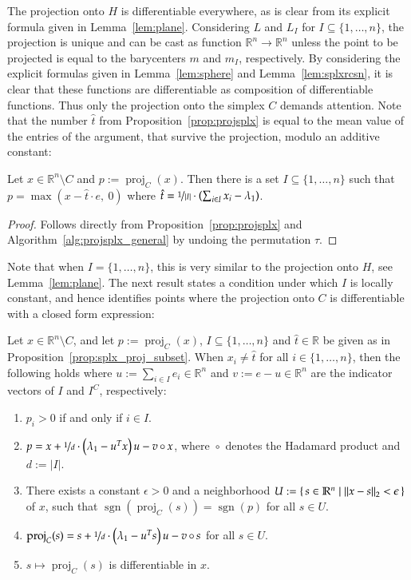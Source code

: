 \documentclass[twoside,11pt]{article}
\DeclareMathOperator{\proj}{proj}
\DeclareMathOperator{\sgn}{sgn}
\DeclareMathOperator{\hada}{\circ}
\newcommand{\R}{\mathbb{R}}
\newcommand{\0}{\mathcal{O}}
\newcommand{\transp}{^T}
\newcommand{\norm}[1]{\left\Vert#1\right\Vert}
\newcommand{\abs}[1]{\left\vert #1 \right\vert}
\newcommand{\discint}[2]{\{#1,\dotsc,#2\}}
\newcommand{\inint}[2]{\in\discint{#1}{#2}}
\begin{document}
The projection onto $H$ is differentiable everywhere, as is clear from its explicit formula given in Lemma~\ref{lem:plane}.
Considering $L$ and $L_I$ for $I\subseteq\discint{1}{n}$, the projection is unique and can be cast as function $\R^n\to\R^n$ unless the point to be projected is equal to the barycenters $m$ and $m_I$, respectively.
By considering the explicit formulas given in Lemma~\ref{lem:sphere} and Lemma~\ref{lem:splxrcsn}, it is clear that these functions are differentiable as composition of differentiable functions.
Thus only the projection onto the simplex $C$ demands attention.
Note that the number $\hat{t}$ from Proposition~\ref{prop:projsplx} is equal to the mean value of the entries of the argument, that survive the projection, modulo an additive constant:
\begin{proposition}
\label{prop:splx_proj_subset}
Let $x\in\R^n\setminus C$ and $p := \proj_C(x)$.
Then there is a set $I\subseteq\discint{1}{n}$ such that $p = \max(x - \hat{t}\cdot e,\ 0)$ where $\hat{t} = \nicefrac{1}{\abs{I}}\cdot\left(\sum_{i\in I}x_i - \lambda_1\right)$.
\end{proposition}
\begin{proof}
Follows directly from Proposition~\ref{prop:projsplx} and Algorithm~\ref{alg:projsplx_general} by undoing the permutation $\tau$.
\end{proof}
Note that when $I = \discint{1}{n}$, this is very similar to the projection onto $H$, see Lemma~\ref{lem:plane}.
The next result states a condition under which $I$ is locally constant, and hence identifies points where the projection onto $C$ is differentiable with a closed form expression:
\begin{lemma}
\label{lem:splx_proj_analytics}
Let $x\in\R^n\setminus C$, and let $p := \proj_C(x)$, $I\subseteq\discint{1}{n}$ and $\hat{t}\in\R$ be given as in Proposition~\ref{prop:splx_proj_subset}.
When $x_i\neq\hat{t}$ for all $i\inint{1}{n}$, then the following holds where $u := \sum_{i\in I}e_i\in\R^n$ and $v := e - u\in\R^n$ are the indicator vectors of $I$ and $I^C$, respectively:
\begin{enumerate}
\item \label{lem:splx_proj_analytics_a}
$p_i > 0$ if and only if $i\in I$.

\item \label{lem:splx_proj_analytics_b}
$p = x + \nicefrac{1}{d}\cdot\left(\lambda_1 - u\transp x\right)u - v\hada x$, where $\hada$ denotes the Hadamard product and $d := \abs{I}$.

\item \label{lem:splx_proj_analytics_c}
There exists a constant $\epsilon > 0$ and a neighborhood $U := \set{s\in\R^n | \norm{x - s}_2 < \epsilon}$ of $x$, such that $\sgn(\proj_C(s)) = \sgn(p)$ for all $s\in U$.

\item \label{lem:splx_proj_analytics_d}
$\proj_C(s) = s + \nicefrac{1}{d}\cdot\left(\lambda_1 - u\transp s\right)u - v\hada s$ for all $s\in U$.

\item \label{lem:splx_proj_analytics_e}
$s\mapsto\proj_C(s)$ is differentiable in $x$.
\end{enumerate}
\end{lemma}
\end{document}
